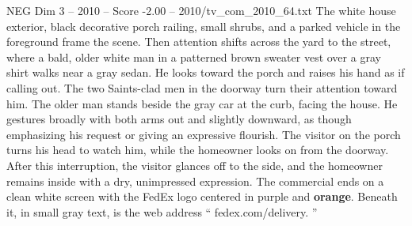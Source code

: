 \begin{textsample}{NEG Dim 3 – 2010 – Score -2.00 – 2010/tv\_com\_2010\_64.txt}
The white house exterior, black decorative porch railing, small shrubs, and a parked vehicle in the foreground frame the scene.
Then attention shifts across the yard to the street, where a bald, older white man in a patterned brown sweater vest over a gray shirt walks near a gray sedan.
He looks toward the porch and raises his hand as if calling out.
The two Saints-clad men in the doorway turn their attention toward him.
The older man stands beside the gray car at the curb, facing the house.
He gestures broadly with both arms out and slightly downward, as though emphasizing his request or giving an expressive flourish.
The visitor on the porch turns his head to watch him, while the homeowner looks on from the doorway.
After this interruption, the visitor glances off to the side, and the homeowner remains inside with a dry, unimpressed expression.
The commercial ends on a clean white screen with the FedEx logo centered in purple and \textbf{orange}.
Beneath it, in small gray text, is the web address “ fedex.com/delivery. ”

\end{textsample}

